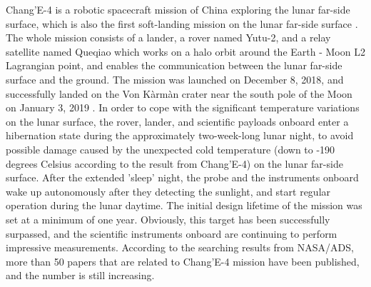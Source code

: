 Chang'E-4 is a robotic spacecraft mission of China exploring the lunar far-side surface, which is also the first soft-landing mission on the lunar far-side surface \citep{Li2021SSRv}. The whole mission consists of a lander, a rover named Yutu-2, and a relay satellite named Queqiao which works on a halo orbit around the Earth - Moon L2 Lagrangian point, and enables the communication between the lunar far-side surface and the ground. The mission was launched on December 8, 2018, and successfully landed on the Von K\`arm\`an crater near the south pole of the Moon on January 3, 2019 \citep{Wu2019NatGe}. In order to cope with the significant temperature variations on the lunar surface, the rover, lander, and scientific payloads onboard enter a hibernation state during the approximately two-week-long lunar night, to avoid possible damage caused by the unexpected cold temperature (down to -190 degrees Celsius according to the result from Chang'E-4) on the lunar far-side surface. After the extended 'sleep' night, the probe and the instruments onboard wake up autonomously after they detecting the sunlight, and start regular operation during the lunar daytime. The initial design lifetime of the mission was set at a minimum of one year. Obviously, this target has been successfully surpassed, and the scientific instruments onboard are continuing to perform impressive measurements. According to the searching results from NASA/ADS, more than 50 papers that are related to Chang'E-4 mission have been published, and the number is still increasing.

